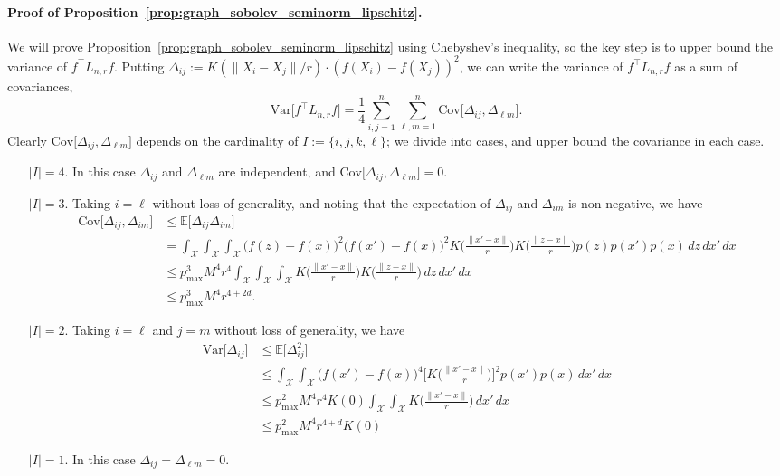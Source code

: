 \documentclass[twoside]{article}
\newcommand{\Var}{\mathrm{Var}}
\newcommand{\Cov}{\mathrm{Cov}}
\newcommand{\1}{\mathbf{1}}
\newcommand{\Lap}{L}
\newcommand{\Xset}{\mathcal{X}}
\newcommand{\Ebb}{\mathbb{E}}
\theoremstyle{definition}
\theoremstyle{remark}
\begin{document}
\paragraph{Proof of Proposition~\ref{prop:graph_sobolev_seminorm_lipschitz}.}
We will prove Proposition~\ref{prop:graph_sobolev_seminorm_lipschitz} using Chebyshev's inequality, so the key step is to upper bound the variance of $f^{\top}\Lap_{n,r}f$. Putting $\varDelta_{ij} := K(\|X_i - X_j\|/r) \cdot (f(X_i) - f(X_j))^2$, we can write the variance of $f^{\top} \Lap_{n,r} f$ as a sum of covariances,
\begin{equation*}
\Var\bigl[f^{\top} \Lap_{n,r} f\bigr] = \frac{1}{4} \sum_{i, j = 1}^{n} \sum_{\ell,m = 1}^{n} \Cov\bigl[\varDelta_{ij},\varDelta_{\ell m}\bigr].
\end{equation*}
Clearly $\Cov\bigl[\varDelta_{ij},\varDelta_{\ell m}\bigr]$ depends on the cardinality of $I := \{i,j,k,\ell\}$; we divide into cases, and upper bound the covariance in each case.
\begin{enumerate}
	\item[$\bigl|I\bigr| = 4$.] In this case $\varDelta_{ij}$ and $\varDelta_{\ell m}$ are independent, and $\Cov\bigl[\varDelta_{ij},\varDelta_{\ell m}\bigr] = 0$.
	\item[$\bigl|I\bigr| = 3$.] Taking $i = \ell$ without loss of generality, and noting that the expectation of $\Delta_{ij}$ and $\Delta_{im}$ is non-negative, we have
	\begin{align*}
	\Cov\bigl[\varDelta_{ij},\varDelta_{i m}\bigr] & \leq \Ebb\bigl[\varDelta_{ij} \varDelta_{i m} \bigr] \\
	& = \int_{\Xset} \int_{\Xset} \int_{\Xset} \bigl(f(z) - f(x)\bigr)^2 \bigl(f(x') - f(x)\bigr)^2 K\biggl(\frac{\|x' - x\|}{r}\biggr) K\biggl(\frac{\|z - x\|}{r}\biggr) p(z) p(x') p(x) \,dz \,dx' \,dx \\
	& \leq p_{\max}^3 M^4 r^4 \int_{\Xset} \int_{\Xset} \int_{\Xset} K\biggl(\frac{\|x' - x\|}{r}\biggr) K\biggl(\frac{\|z - x\|}{r}\biggr) \,dz \,dx' \,dx \\
	& \leq p_{\max}^3 M^4 r^{4 + 2d}.
	\end{align*}
	\item[$\bigl|I\bigr| = 2$.] Taking $i = \ell$ and $j = m$ without loss of generality, we have
	\begin{align*}
	\Var\bigl[\varDelta_{ij}\bigr] & \leq \Ebb\bigl[\varDelta_{ij}^2\bigr] \\
	& \leq \int_{\Xset} \int_{\Xset} \bigl(f(x') - f(x)\bigr)^4 \biggl[K\biggl(\frac{\|x' - x\|}{r}\biggr)\biggr]^2 p(x') p(x) \,dx' \,dx \\
	& \leq p_{\max}^2 M^4 r^4 K(0) \int_{\Xset} \int_{\Xset} K\biggl(\frac{\|x' - x\|}{r}\biggr) \,dx' \,dx \\
	& \leq p_{\max}^2 M^4 r^{4 + d} K(0)
	\end{align*}
	\item[$\bigl|I\bigr| = 1$.] In this case $\varDelta_{i j} = \varDelta_{\ell m} = 0$.
\end{enumerate}
\end{document}
